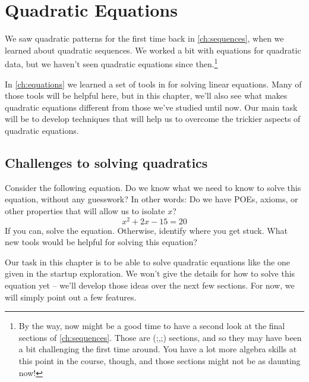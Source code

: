\chapter{Quadratic Equations}
\label{ch:quadeq}


We saw quadratic patterns for the first time back in \cref{ch:sequences}, when we learned about quadratic sequences. We worked a bit with equations for quadratic data, but we haven't seen quadratic equations since then.\footnote{By the way, now might be a good time to have a second look at the final sections of \cref{ch:sequences}. Those are (;,;) sections, and so they may have been a bit challenging the first time around. You have a lot more algebra skills at this point in the course, though, and those sections might not be as daunting now!}

In \cref{ch:equations} we learned a set of tools in for solving linear equations. Many of those tools will be helpful here, but in this chapter, we'll also see what makes quadratic equations different from those we've studied until now. Our main task will be to develop techniques that will help us to overcome the trickier aspects of quadratic equations.

\section{Challenges to solving quadratics}

\begin{boxedexplore}
Consider the following equation. Do we know what we need to know to solve this equation, without any guesswork? In other words: Do we have POEs, axioms, or other properties that will allow us to isolate $x$?
\[x^2 + 2x - 15 = 20\]
If you can, solve the equation. Otherwise, identify where you get stuck. What new tools would be helpful for solving this equation?
\end{boxedexplore}

Our task in this chapter is to be able to solve quadratic equations like the one given in the startup exploration. We won't give the details for how to solve this equation yet -- we'll develop those ideas over the next few sections. For now, we will simply point out a few features.

